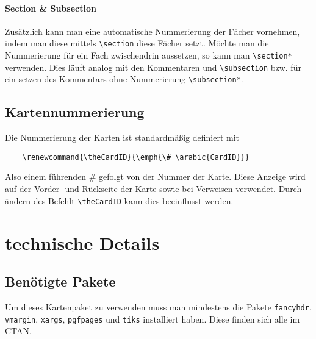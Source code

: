 \documentclass[a4paper]{article}
\begin{document}
\paragraph{Section \& Subsection} Zusätzlich kann man eine automatische Nummerierung der Fächer vornehmen, indem man diese mittels \lstinline!\section! diese Fächer setzt. Möchte man die Nummerierung für ein Fach zwischendrin aussetzen, so kann man \lstinline!\section*! verwenden. Dies läuft analog mit den Kommentaren und \lstinline!\subsection! bzw. für ein setzen des Kommentars ohne Nummerierung \lstinline!\subsection*!.

\subsection{Kartennummerierung}
Die Nummerierung der Karten ist standardmäßig definiert mit
\begin{lstlisting}
	\renewcommand{\theCardID}{\emph{\# \arabic{CardID}}}
\end{lstlisting}
Also einem führenden \# gefolgt von der Nummer der Karte. Diese Anzeige wird auf der Vorder- und Rückseite der Karte sowie bei Verweisen verwendet. Durch ändern des Befehlt \lstinline!\theCardID! kann dies beeinflusst werden.
%
%
%
\section{technische Details}
\subsection{Benötigte Pakete}
Um dieses Kartenpaket zu verwenden muss man mindestens die Pakete \lstinline!fancyhdr!, \lstinline!vmargin!, \lstinline!xargs!, \lstinline!pgfpages! und \lstinline!tiks! installiert haben. Diese finden sich alle im CTAN.
\end{document}
